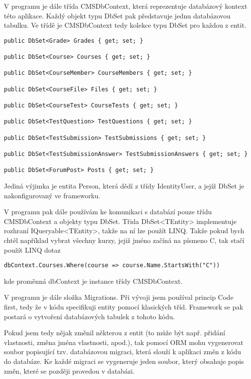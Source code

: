 V programu je dále třída CMSDbContext, která reprezentuje databázový kontext této aplikace. Každý objekt typu DbSet pak představuje jednu databázovou tabulku. Ve třídě je CMSDbContext tedy kolekce typu DbSet pro každou z entit.

\begin{lstlisting}
public DbSet<Grade> Grades { get; set; }

public DbSet<Course> Courses { get; set; }

public DbSet<CourseMember> CourseMembers { get; set; }

public DbSet<CourseFile> Files { get; set; }

public DbSet<CourseTest> CourseTests { get; set; }

public DbSet<TestQuestion> TestQuestions { get; set; }

public DbSet<TestSubmission> TestSubmissions { get; set; }

public DbSet<TestSubmissionAnswer> TestSubmissionAnswers { get; set; }

public DbSet<ForumPost> Posts { get; set; }
\end{lstlisting}

Jediná výjimka je entita Person, která dědí z třídy IdentityUser, a jejíž DbSet je nakonfigurovaný ve frameworku. 

V programu pak dále používám ke komunikaci s databází pouze třídu CMSDbContext a objekty typu DbSet. Třida DbSet<TEntity> implementuje rozhraní IQueryable<TEntity>, takže na ní lze použít LINQ. Takže pokud bych chtěl například vybrat všechny kurzy, jejiž jméno začíná na písmeno C, tak stačí použít LINQ dotaz
\begin{lstlisting}
dbContext.Courses.Where(course => course.Name.StartsWith("C"))
\end{lstlisting}
kde proměnná dbContext je instance třídy CMSDbContext.

V programu je dále složka Migrations. Při vývoji jsem používal princip Code first, tedy že v kódu specifikuji entity pomocí klasických tříd. Framework se pak postará o vytvoření databázových tabulek z tohoto kódu.

Pokud jsem tedy nějak změnil některou z entit (to může být např. přidání vlastnosti, změna jména vlastnosti, apod.), tak pomocí ORM mohu vygenerovat soubor popisující tzv. databázovou migraci, která slouží k aplikaci změn z kódu do databáze. Ke každé migraci se vygeneruje jeden soubor, který obsahuje popis změn, které se později provedou v databázi.

